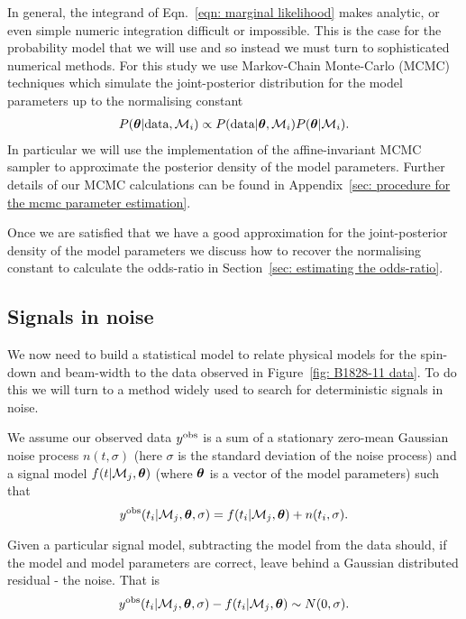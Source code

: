 \documentclass[../full_thesis/full_thesis.tex]{subfiles}
\begin{document}
In general, the integrand of Eqn.~\eqref{eqn: marginal likelihood} makes
analytic, or even simple numeric integration difficult or impossible. This is
the case for the probability model that we will use and so instead we must turn
to sophisticated numerical methods.  For this study we use Markov-Chain
Monte-Carlo (MCMC) techniques which simulate the joint-posterior distribution
for the model parameters up to the normalising constant
\begin{align}
P(\boldsymbol{\theta} | \textrm{data}, \mathcal{M}_{i}) \propto
P(\textrm{data}| \boldsymbol{\theta}, \mathcal{M}_{i})P(\boldsymbol{\theta} | \mathcal{M}_{i}).
\end{align}
In particular we will use the \citet{Foreman-Mackay2013} implementation of the
affine-invariant MCMC sampler \citep{Goodman2010} to approximate the posterior
density of the model parameters.  Further details of our MCMC calculations can
be found in Appendix~\ref{sec: procedure for the mcmc parameter estimation}.

Once we are satisfied that we have a good approximation for the joint-posterior
density of the model parameters we discuss how to recover the normalising
constant to calculate the odds-ratio in Section~\ref{sec: estimating the
odds-ratio}.

\subsection{Signals in noise}
We now need to build a statistical model to relate physical models for the
spin-down and beam-width to the data observed in Figure~\ref{fig: B1828-11 data}.
To do this we will turn to a method widely used to search for deterministic
signals in noise.

We assume our observed data $y^{\textrm{obs}}$ is a sum of a stationary zero-mean
Gaussian noise process
$n(t, \sigma)$ (here $\sigma$ is the  standard deviation of the noise process)
and a signal model $f(t| \mathcal{M}_{j}, \boldsymbol{\theta})$ (where $\boldsymbol{\theta}$ is a vector of the
model parameters) such that
\begin{equation}
y^{\textrm{obs}}(t_i| \mathcal{M}_{j}, \boldsymbol{\theta}, \sigma) = f(t_i|\mathcal{M}_{j}, \boldsymbol{\theta}) + n(t_i, \sigma).
\label{eqn: yobs def}
\end{equation}

Given a particular signal model, subtracting the model from the data
should, if the model and model parameters are correct, leave behind a Gaussian
distributed residual - the noise. That is
\begin{equation}
y^{\textrm{obs}}(t_i| \mathcal{M}_{j}, \boldsymbol{\theta}, \sigma) - f(t_i|\mathcal{M}_{j}, \boldsymbol{\theta}) \sim N(0, \sigma).
\end{equation}
\end{document}
